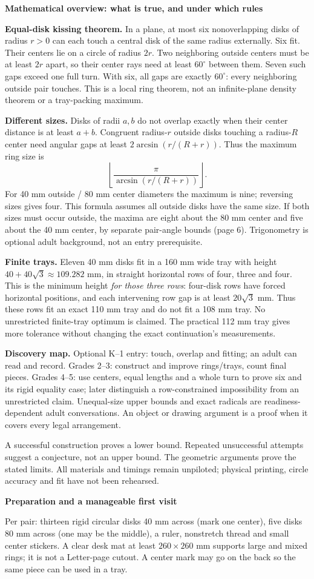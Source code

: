 \documentclass[11pt]{article}
\newcommand{\heading}[1]{\par\textbf{#1}\par}
\begin{document}
\heading{Mathematical overview: what is true, and under which rules}
\textbf{Equal-disk kissing theorem.} In a plane, at most six nonoverlapping disks of radius $r>0$ can each touch a central disk of the same radius externally. Six fit. Their centers lie on a circle of radius $2r$. Two neighboring outside centers must be at least $2r$ apart, so their center rays need at least $60^\circ$ between them. Seven such gaps exceed one full turn. With six, all gaps are exactly $60^\circ$: every neighboring outside pair touches. This is a local ring theorem, not an infinite-plane density theorem or a tray-packing maximum.

\textbf{Different sizes.} Disks of radii $a,b$ do not overlap exactly when their center distance is at least $a+b$. Congruent radius-$r$ outside disks touching a radius-$R$ center need angular gaps at least $2\arcsin(r/(R+r))$. Thus the maximum ring size is
\[\left\lfloor\frac{\pi}{\arcsin(r/(R+r))}\right\rfloor.\]
For 40 mm outside / 80 mm center diameters the maximum is nine; reversing sizes gives four. This formula assumes all outside disks have the same size. If both sizes must occur outside, the maxima are eight about the 80 mm center and five about the 40 mm center, by separate pair-angle bounds (page 6). Trigonometry is optional adult background, not an entry prerequisite.

\textbf{Finite trays.} Eleven 40 mm disks fit in a 160 mm wide tray with height $40+40\sqrt 3\approx 109.282$ mm, in straight horizontal rows of four, three and four. This is the minimum height \emph{for those three rows}: four-disk rows have forced horizontal positions, and each intervening row gap is at least $20\sqrt 3$ mm. Thus these rows fit an exact 110 mm tray and do not fit a 108 mm tray. No unrestricted finite-tray optimum is claimed. The practical 112 mm tray gives more tolerance without changing the exact continuation's measurements.

\textbf{Discovery map.} Optional K--1 entry: touch, overlap and fitting; an adult can read and record. Grades 2--3: construct and improve rings/trays, count final pieces. Grades 4--5: use centers, equal lengths and a whole turn to prove six and its rigid equality case; later distinguish a row-constrained impossibility from an unrestricted claim. Unequal-size upper bounds and exact radicals are readiness-dependent adult conversations. An object or drawing argument is a proof when it covers every legal arrangement.

A successful construction proves a lower bound. Repeated unsuccessful attempts suggest a conjecture, not an upper bound. The geometric arguments prove the stated limits. All materials and timings remain unpiloted; physical printing, circle accuracy and fit have not been rehearsed.
\newpage
\heading{Preparation and a manageable first visit}
Per pair: thirteen rigid circular disks 40 mm across (mark one center), five disks 80 mm across (one may be the middle), a ruler, nonstretch thread and small center stickers. A clear desk mat at least $260\times 260$ mm supports large and mixed rings; it is not a Letter-page cutout. A center mark may go on the back so the same piece can be used in a tray.
\end{document}
